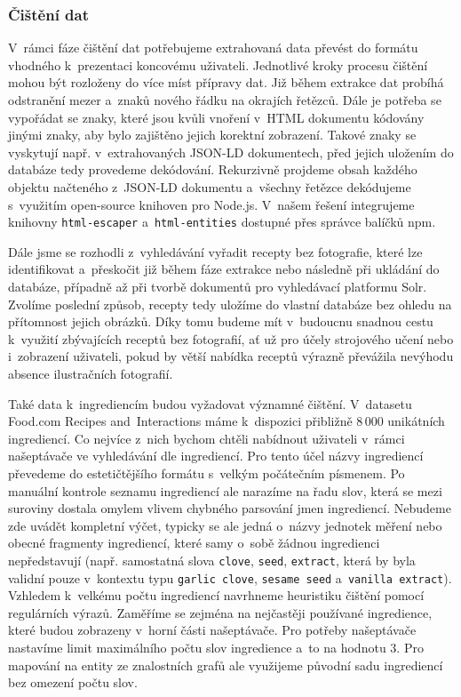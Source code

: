 \subsubsection{Čištění dat}

V~rámci fáze čištění dat potřebujeme extrahovaná data převést do formátu vhodného k~prezentaci koncovému uživateli. Jednotlivé kroky procesu čištění mohou být rozloženy do více míst přípravy dat. Již během extrakce dat probíhá odstranění mezer a~znaků nového řádku na okrajích řetězců. Dále je potřeba se vypořádat se znaky, které jsou kvůli vnoření v~HTML dokumentu kódovány jinými znaky, aby bylo zajištěno jejich korektní zobrazení. Takové znaky se vyskytují např. v~extrahovaných JSON-LD dokumentech, před jejich uložením do databáze tedy provedeme dekódování. Rekurzivně projdeme obsah každého objektu načteného z~JSON-LD dokumentu a~všechny řetězce dekódujeme s~využitím open-source knihoven pro Node.js. V~našem řešení integrujeme knihovny \texttt{html-escaper} a~\texttt{html-entities} dostupné přes správce balíčků npm.

Dále jsme se rozhodli z~vyhledávání vyřadit recepty bez fotografie, které lze identifikovat a~přeskočit již během fáze extrakce nebo následně při ukládání do databáze, případně až při tvorbě dokumentů pro vyhledávací platformu Solr. Zvolíme poslední způsob, recepty tedy uložíme do vlastní databáze bez ohledu na přítomnost jejich obrázků. Díky tomu budeme mít v~budoucnu snadnou cestu k~využití zbývajících receptů bez fotografií, ať už pro účely strojového učení nebo i~zobrazení uživateli, pokud by větší nabídka receptů výrazně převážila nevýhodu absence ilustračních fotografií.

Také data k~ingrediencím budou vyžadovat významné čištění. V~datasetu Food.com Recipes and~Interactions máme k~dispozici přibližně $8\,000$ unikátních ingrediencí. Co nejvíce z~nich bychom chtěli nabídnout uživateli v~rámci našeptávače ve vyhledávání dle ingrediencí. Pro tento účel názvy ingrediencí převedeme do estetičtějšího formátu s~velkým počátečním písmenem. Po manuální kontrole seznamu ingrediencí ale narazíme na řadu slov, která se mezi suroviny dostala omylem vlivem chybného parsování jmen ingrediencí. Nebudeme zde uvádět kompletní výčet, typicky se ale jedná o~názvy jednotek měření nebo obecné fragmenty ingrediencí, které samy o~sobě žádnou ingredienci nepředstavují (např. samostatná slova \texttt{clove}, \texttt{seed}, \texttt{extract}, která by byla validní pouze v~kontextu typu \texttt{garlic clove}, \texttt{sesame seed} a~\texttt{vanilla extract}). Vzhledem k~velkému počtu ingrediencí navrhneme heuristiku čištění pomocí regulárních výrazů. Zaměříme se zejména na nejčastěji používané ingredience, které budou zobrazeny v~horní části našeptávače. Pro potřeby našeptávače nastavíme limit maximálního počtu slov ingredience a~to na hodnotu $3$. Pro mapování na entity ze znalostních grafů ale využijeme původní sadu ingrediencí bez omezení počtu slov.

